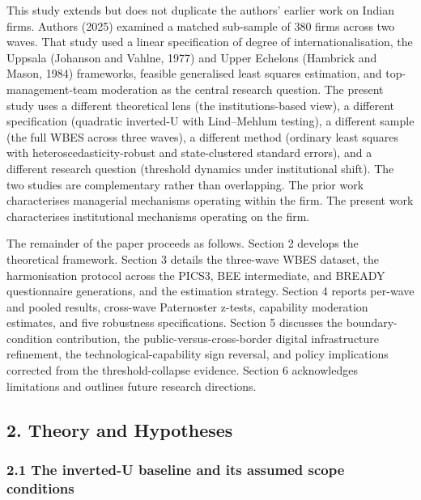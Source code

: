 \documentclass[
  12pt,a4paper]{article}
\begin{document}
This study extends but does not duplicate the authors' earlier work on
Indian firms. Authors (2025) examined a matched sub-sample of 380 firms
across two waves. That study used a linear specification of degree of
internationalisation, the Uppsala (Johanson and Vahlne, 1977) and Upper
Echelons (Hambrick and Mason, 1984) frameworks, feasible generalised
least squares estimation, and top-management-team moderation as the
central research question. The present study uses a different
theoretical lens (the institutions-based view), a different
specification (quadratic inverted-U with Lind--Mehlum testing), a
different sample (the full WBES across three waves), a different method
(ordinary least squares with heteroscedasticity-robust and
state-clustered standard errors), and a different research question
(threshold dynamics under institutional shift). The two studies are
complementary rather than overlapping. The prior work characterises
managerial mechanisms operating within the firm. The present work
characterises institutional mechanisms operating on the firm.

The remainder of the paper proceeds as follows. Section 2 develops the
theoretical framework. Section 3 details the three-wave WBES dataset,
the harmonisation protocol across the PICS3, BEE intermediate, and
BREADY questionnaire generations, and the estimation strategy. Section 4
reports per-wave and pooled results, cross-wave Paternoster z-tests,
capability moderation estimates, and five robustness specifications.
Section 5 discusses the boundary-condition contribution, the
public-versus-cross-border digital infrastructure refinement, the
technological-capability sign reversal, and policy implications
corrected from the threshold-collapse evidence. Section 6 acknowledges
limitations and outlines future research directions.

\hypertarget{theory-and-hypotheses}{%
\subsection{2. Theory and Hypotheses}\label{theory-and-hypotheses}}

\hypertarget{the-inverted-u-baseline-and-its-assumed-scope-conditions}{%
\subsubsection{2.1 The inverted-U baseline and its assumed scope
conditions}\label{the-inverted-u-baseline-and-its-assumed-scope-conditions}}
\end{document}

